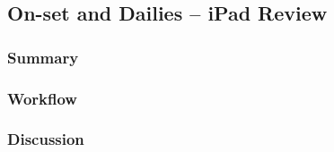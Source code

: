 \subsection{On-set and Dailies -- iPad Review} \label{subsec:ff-onset-dailies-ipad}

	\subsubsection{Summary}
	
	\lipsum[1] %
	
	\subsubsection{Workflow}
	
	\lipsum[1]  %
	
	\subsubsection{Discussion}
	
	\lipsum[1]  %